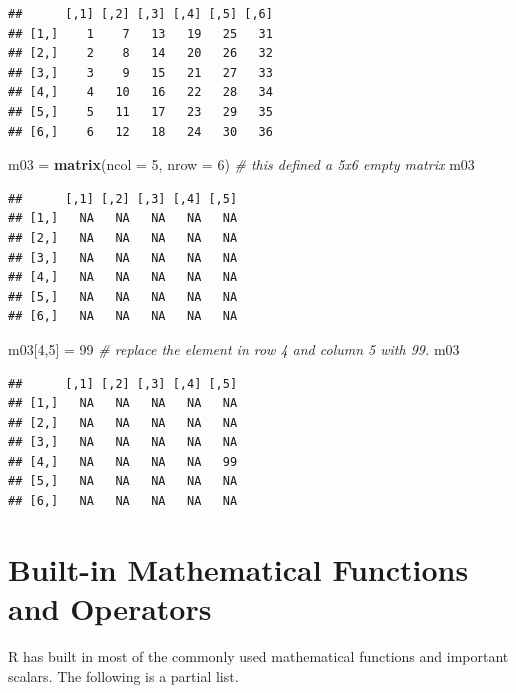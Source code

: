 \documentclass[
]{book}
\newenvironment{Shaded}{\begin{snugshade}}{\end{snugshade}}
\newcommand{\AttributeTok}[1]{\textcolor[rgb]{0.13,0.29,0.53}{#1}}
\newcommand{\CommentTok}[1]{\textcolor[rgb]{0.56,0.35,0.01}{\textit{#1}}}
\newcommand{\DecValTok}[1]{\textcolor[rgb]{0.00,0.00,0.81}{#1}}
\newcommand{\FunctionTok}[1]{\textcolor[rgb]{0.13,0.29,0.53}{\textbf{#1}}}
\newcommand{\NormalTok}[1]{#1}
\newcommand{\OtherTok}[1]{\textcolor[rgb]{0.56,0.35,0.01}{#1}}
\begin{document}
\begin{verbatim}
##      [,1] [,2] [,3] [,4] [,5] [,6]
## [1,]    1    7   13   19   25   31
## [2,]    2    8   14   20   26   32
## [3,]    3    9   15   21   27   33
## [4,]    4   10   16   22   28   34
## [5,]    5   11   17   23   29   35
## [6,]    6   12   18   24   30   36
\end{verbatim}

\begin{Shaded}
\begin{Highlighting}[]
\NormalTok{m03 }\OtherTok{=} \FunctionTok{matrix}\NormalTok{(}\AttributeTok{ncol =} \DecValTok{5}\NormalTok{, }\AttributeTok{nrow =} \DecValTok{6}\NormalTok{)       }\CommentTok{\# this defined a 5x6 empty matrix}
\NormalTok{m03}
\end{Highlighting}
\end{Shaded}

\begin{verbatim}
##      [,1] [,2] [,3] [,4] [,5]
## [1,]   NA   NA   NA   NA   NA
## [2,]   NA   NA   NA   NA   NA
## [3,]   NA   NA   NA   NA   NA
## [4,]   NA   NA   NA   NA   NA
## [5,]   NA   NA   NA   NA   NA
## [6,]   NA   NA   NA   NA   NA
\end{verbatim}

\begin{Shaded}
\begin{Highlighting}[]
\NormalTok{m03[}\DecValTok{4}\NormalTok{,}\DecValTok{5}\NormalTok{] }\OtherTok{=} \DecValTok{99}                          \CommentTok{\# replace the element in row 4 and column 5 with 99.}
\NormalTok{m03}
\end{Highlighting}
\end{Shaded}

\begin{verbatim}
##      [,1] [,2] [,3] [,4] [,5]
## [1,]   NA   NA   NA   NA   NA
## [2,]   NA   NA   NA   NA   NA
## [3,]   NA   NA   NA   NA   NA
## [4,]   NA   NA   NA   NA   99
## [5,]   NA   NA   NA   NA   NA
## [6,]   NA   NA   NA   NA   NA
\end{verbatim}

\hfill\break

\hypertarget{built-in-mathematical-functions-and-operators}{%
\section{Built-in Mathematical Functions and Operators}\label{built-in-mathematical-functions-and-operators}}

R has built in most of the commonly used mathematical functions and important scalars. The following is a partial list.
\end{document}
